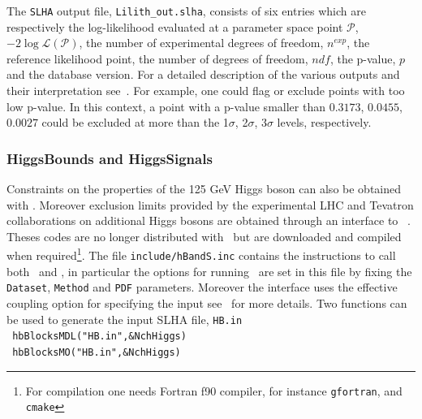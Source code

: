 \documentclass[12pt,a4paper]{article}
\begin{document}
The {\tt SLHA} output file, \verb|Lilith_out.slha|, consists of six entries which are respectively the log-likelihood evaluated at a parameter space point $\mathcal{P}$, $-2\log\mathcal{L}(\mathcal{P})$, the number of experimental degrees of freedom, $n^{exp}$, the reference likelihood point,  the number of degrees of freedom, $ndf$, the p-value, $p$ and the database version.
For a detailed description of the various outputs and their interpretation see~\cite{Bernon:2015hsa,Kraml:2019sis}. For example, one could flag or exclude points with too low p-value. In this context, a point with a p-value smaller than $0.3173$, $0.0455$, $0.0027$ could be excluded at more than the 1$\sigma$, 2$\sigma$, 3$\sigma$ levels, respectively.


\subsubsection{HiggsBounds and HiggsSignals}

Constraints on the properties of the 125 GeV Higgs boson can also  be obtained with \HS.
Moreover exclusion limits provided by the experimental LHC and Tevatron collaborations on additional Higgs bosons are obtained through an interface to \HB~\cite{Bechtle:2011sb}.
Theses codes are no longer distributed with \micro\ but are downloaded and compiled   when required\footnote{For compilation one needs Fortran f90 compiler, for instance {\tt gfortran}, and {\tt cmake}}.   
The file {\tt include/hBandS.inc}  contains the instructions  to call both \HB\ and \HS,  in particular the options for running \HS\ are set in this file by  fixing the  \verb|Dataset|, \verb|Method| and
\verb|PDF| parameters. Moreover the interface uses  the effective coupling option for specifying the input see~\cite{Bechtle:2013wla} for more details. 
Two  functions can be used to generate the input SLHA file, \verb|HB.in|\\

\noindent
\verb| hbBlocksMDL("HB.in",&NchHiggs) | \\
\verb| hbBlocksMO("HB.in",&NchHiggs) | \\
\end{document}
